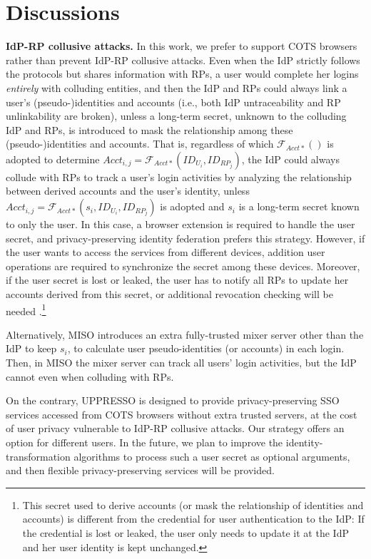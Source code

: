 \section{Discussions}
\label{sec:discussion}

\noindent \textbf{IdP-RP collusive attacks.} 
In this work, we prefer to support COTS browsers rather than prevent IdP-RP collusive attacks.
Even when the IdP strictly follows the protocols but shares information with RPs,
    a user would complete her logins \emph{entirely} with colluding entities,
    and then the IdP and RPs could always link a user's (pseudo-)identities and accounts (i.e., both IdP untraceability and RP unlinkability are broken),
    unless a long-term secret, unknown to the colluding IdP and RPs,
                is introduced to mask the relationship among these (pseudo-)identities and accounts.
That is, regardless of which $\mathcal{F}_{Acct\ast}()$ is adopted to determine
$Acct_{i,j} = \mathcal{F}_{Acct\ast}(ID_{U_i}, ID_{RP_j})$,
the IdP could always collude with RPs to track a user's login activities by analyzing the relationship between derived accounts and the user's identity,
unless $Acct_{i,j} = \mathcal{F}_{Acct\ast}(s_i,ID_{U_i}, ID_{RP_j})$ is adopted and $s_i$ is a long-term secret known to only the user.
In this case,
    a browser extension is required
            to handle the user secret,
             and privacy-preserving identity federation \cite{ELPASSO, UnlimitID, idemix, PseudoID, uprov} prefers this strategy.
However, if the user wants to access the services from different devices,
    addition user operations are required to synchronize the secret among these devices.
Moreover, if the user secret is lost or leaked, the user has to notify all RPs to update her accounts derived from this secret, or additional revocation checking will be needed \cite{ELPASSO, UnlimitID}.\footnote{This secret used to derive accounts (or mask the relationship of identities and accounts) is different from the credential for user
authentication to the IdP: If the credential is lost or leaked, the user only needs to update it at the IdP and her user identity is kept unchanged.}

Alternatively, MISO \cite{miso} introduces an extra fully-trusted mixer server other than the IdP to keep $s_i$,
            to calculate user pseudo-identities (or accounts) in each login.
Then, in MISO the mixer server can track all users' login activities,
    but the IdP cannot even when colluding with RPs.

On the contrary,
    UPPRESSO is designed to provide privacy-preserving SSO services accessed from COTS browsers without extra trusted servers,
        at the cost of user privacy vulnerable to IdP-RP collusive attacks.
Our strategy offers an option for different users.
In the future, we plan to improve the identity-transformation algorithms
    to process such a user secret as optional arguments,
    and then flexible privacy-preserving services will be provided.

